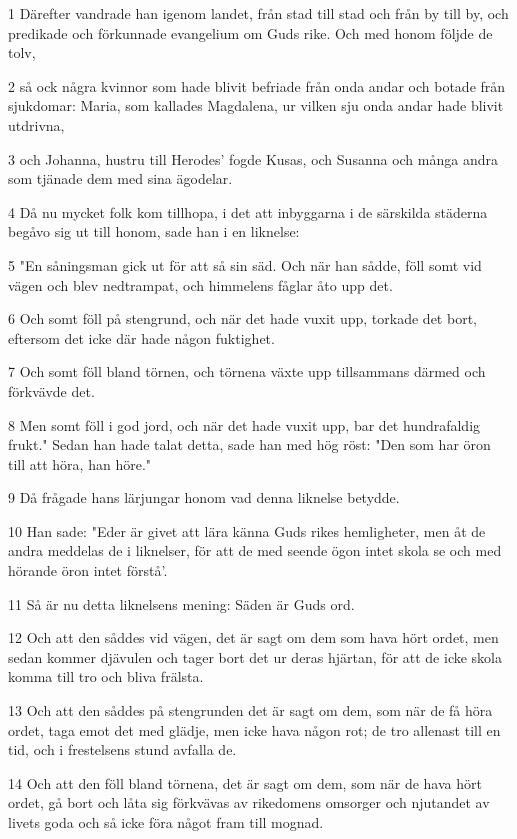 \par 1 Därefter vandrade han igenom landet, från stad till stad och från by till by, och predikade och förkunnade evangelium om Guds rike. Och med honom följde de tolv,
\par 2 så ock några kvinnor som hade blivit befriade från onda andar och botade från sjukdomar: Maria, som kallades Magdalena, ur vilken sju onda andar hade blivit utdrivna,
\par 3 och Johanna, hustru till Herodes' fogde Kusas, och Susanna och många andra som tjänade dem med sina ägodelar.
\par 4 Då nu mycket folk kom tillhopa, i det att inbyggarna i de särskilda städerna begåvo sig ut till honom, sade han i en liknelse:
\par 5 "En såningsman gick ut för att så sin säd. Och när han sådde, föll somt vid vägen och blev nedtrampat, och himmelens fåglar åto upp det.
\par 6 Och somt föll på stengrund, och när det hade vuxit upp, torkade det bort, eftersom det icke där hade någon fuktighet.
\par 7 Och somt föll bland törnen, och törnena växte upp tillsammans därmed och förkvävde det.
\par 8 Men somt föll i god jord, och när det hade vuxit upp, bar det hundrafaldig frukt." Sedan han hade talat detta, sade han med hög röst: "Den som har öron till att höra, han höre."
\par 9 Då frågade hans lärjungar honom vad denna liknelse betydde.
\par 10 Han sade: "Eder är givet att lära känna Guds rikes hemligheter, men åt de andra meddelas de i liknelser, för att de med seende ögon intet skola se och med hörande öron intet förstå'.
\par 11 Så är nu detta liknelsens mening: Säden är Guds ord.
\par 12 Och att den såddes vid vägen, det är sagt om dem som hava hört ordet, men sedan kommer djävulen och tager bort det ur deras hjärtan, för att de icke skola komma till tro och bliva frälsta.
\par 13 Och att den såddes på stengrunden det är sagt om dem, som när de få höra ordet, taga emot det med glädje, men icke hava någon rot; de tro allenast till en tid, och i frestelsens stund avfalla de.
\par 14 Och att den föll bland törnena, det är sagt om dem, som när de hava hört ordet, gå bort och låta sig förkvävas av rikedomens omsorger och njutandet av livets goda och så icke föra något fram till mognad.
